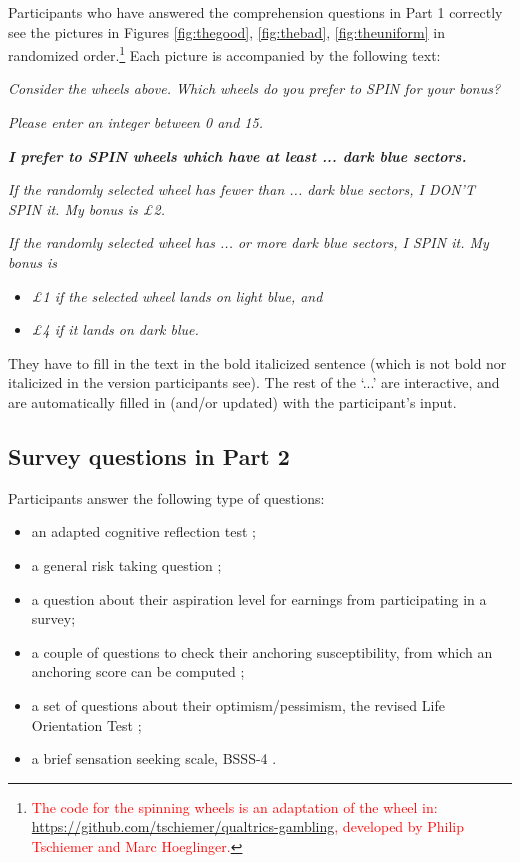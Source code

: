 Participants who have answered the comprehension questions in Part 1 correctly see the pictures  in Figures \ref{fig:thegood}, \ref{fig:thebad}, \ref{fig:theuniform} in randomized order.\footnote{
\textcolor{red}{The code for the spinning wheels is an adaptation of the wheel in: \url{https://github.com/tschiemer/qualtrics-gambling}, developed by Philip Tschiemer and Marc Hoeglinger.}
}
Each picture is accompanied by the following text:

\textit{Consider the wheels above. Which wheels do you prefer to SPIN for your bonus?}

\textit{{\small Please enter an integer between 0 and 15.}}

\textbf{\textit{I prefer to SPIN wheels which have at least ... dark blue sectors.}}

\textit{If the randomly selected wheel has fewer than ... dark blue sectors, I DON'T SPIN it.
My bonus is \pounds2.}

\textit{If the randomly selected wheel has ... or more dark blue sectors, I SPIN it.
My bonus is}
\begin{itemize}
\item \textit{\pounds1 if the selected wheel lands on light blue, and}
\item \textit{\pounds4 if it lands on dark blue.}
\end{itemize}

They have to fill in the text in the bold italicized sentence (which is not bold nor italicized in the version participants see).
The rest of the `...' are interactive, and are automatically filled in (and/or updated) with the participant's input.

\subsection{Survey questions in Part 2}
Participants answer the following type of questions:
\begin{itemize}
\item an adapted cognitive reflection test \citep{Frederick2005,Thomson2016};
\item a general risk taking question \citep{Dohmen2011};
\item a question about their aspiration level for earnings from participating in a survey;
\item a couple of questions to check their anchoring susceptibility, from which an anchoring score can be computed \citep{Cheek2017};
\item a set of questions about their optimism/pessimism, the revised Life Orientation Test \citep{Scheier1994};
\item a brief sensation seeking scale, BSSS-4 \citep{Stephenson2003}.
\end{itemize}

